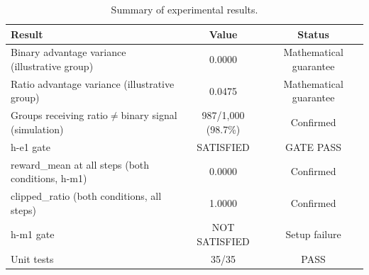 \begin{table}[h]
\centering
\caption{Summary of experimental results.}
\label{tab:summary}
\begin{tabular}{lcc}
\toprule
\textbf{Result} & \textbf{Value} & \textbf{Status} \\
\midrule
Binary advantage variance (illustrative group) & 0.0000 & Mathematical guarantee \\
Ratio advantage variance (illustrative group) & 0.0475 & Mathematical guarantee \\
Groups receiving ratio$\neq$binary signal (simulation) & 987/1,000 (98.7\%) & Confirmed \\
h-e1 gate & SATISFIED & GATE PASS \\
reward\_mean at all steps (both conditions, h-m1) & 0.0000 & Confirmed \\
clipped\_ratio (both conditions, all steps) & 1.0000 & Confirmed \\
h-m1 gate & NOT SATISFIED & Setup failure \\
Unit tests & 35/35 & PASS \\
\bottomrule
\end{tabular}
\end{table}
